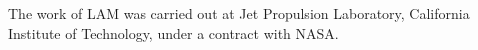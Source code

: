 \documentclass{emulateapj}
\begin{document}
% 
% 
% 
% 
% 
% 



\acknowledgements

The work of LAM was carried out at Jet Propulsion Laboratory, California
Institute of Technology, under a contract with NASA. 



\end{document}
